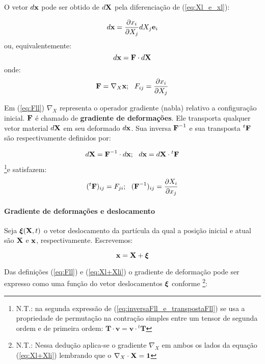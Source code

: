 \documentclass[
	11pt, %
	fleqn, %
	a4paper, %
]{LegrandOrangeBook}
\begin{document}
O vetor $d\textbf{x}$ pode ser obtido de $d\textbf{X}$ pela diferenciação de (\ref{eq:Xl_e_xl}):

\begin{equation}
	\label{eq:dx_indicial}	
	d\textbf{x} = \dfrac{\partial x_i}{\partial X_j}dX_j\textbf{e}_i
\end{equation}
ou, equivalentemente:
\begin{equation}
	\label{eq:dx}	
	d\textbf{x} = \textbf{F} \cdot d\textbf{X}
\end{equation}
onde:
\begin{equation}
	\label{eq:Fll}	
	\textbf{F} = \nabla_X \textbf{x} ; ~~ F_{ij} = \dfrac{\partial x_i}{\partial X_j}
\end{equation}

Em (\ref{eq:Fll}) $\nabla_X$ representa o operador gradiente (nabla) relativo a configuração inicial. $\textbf{F}$ é chamado de \textbf{gradiente de deformações}. Ele transporta qualquer vetor material $d\textbf{X}$ em seu deformado $d\textbf{x}$. Sua inversa $\textbf{F}^{-1}$ e sua transposta ${}^t \textbf{F}$ são respectivamente definidos por:

\begin{equation}
	\label{eq:inversaFll_e_transpostaFll}	
	d\textbf{X} = \textbf{F}^{-1} \cdot d\textbf{x}; ~~ d\textbf{x} = d\textbf{X} \cdot {}^t\textbf{F}
\end{equation}
\footnote{N.T.: na segunda expressão de (\ref{eq:inversaFll_e_transpostaFll}) se usa a propriedade de permutação na contração simples entre um tensor de segunda ordem e de primeira ordem: $\textbf{T} \cdot \textbf{v} = \textbf{v} \cdot {}^t\textbf{T}$}e satisfazem:
\begin{equation}
	\label{eq:inversaFll_e_transpostaFll2}	
	({}^t\textbf{F})_{ij} = F_{ji}; ~~(\textbf{F}^{-1})_{ij} = \dfrac{\partial X_i}{\partial x_j}
\end{equation}

\paragraph{Gradiente de deformações e deslocamento} Seja $\bm{\xi}(\textbf{X},t)$ o vetor deslocamento da partícula da qual a posição inicial e atual são $\textbf{X}$ e $\textbf{x}$, respectivamente. Escrevemos:

\begin{equation}
	\label{eq:Xl+Xli}	
	\textbf{x} = \textbf{X} + \bm{\xi}
\end{equation}

Das definições (\ref{eq:Fll}) e (\ref{eq:Xl+Xli}) o gradiente de deformação pode ser expresso como uma função do vetor deslocamentos $\bm{\xi}$ conforme \footnote{N.T.: Nessa dedução aplica-se o gradiente $\nabla_X$ em ambos os lados da equação (\ref{eq:Xl+Xli}) lembrando que o $\nabla_X \cdot \textbf{X} = \bm{1}$}:
\end{document}
